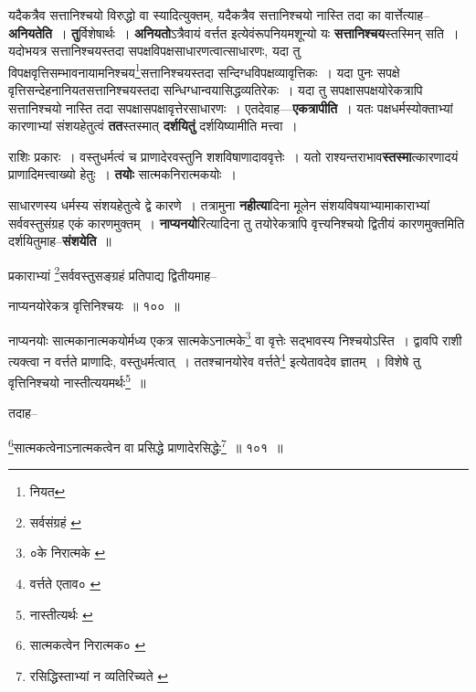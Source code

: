 \documentclass[article,12pt,a4paper]{memoir}
\begin{document}
	  \endgroup
	

	  \pstart यदैकत्रैव सत्तानिश्चयो विरुद्धो वा स्यादित्युक्तम्, यदैकत्रैव सत्तानिश्चयो नास्ति तदा का वार्त्तेत्याह--\textbf{अनियतेति} । \textbf{तु}र्विशेषार्थः । \textbf{अनियतो}ऽत्रैवायं वर्त्तत इत्येवंरूपनियमशून्यो यः \textbf{सत्तानिश्चय}स्तस्मिन् सति । यदोभयत्र सत्तानिश्चयस्तदा सपक्षविपक्षसाधारणत्वात्साधारणः, यदा तु विपक्षवृत्तिसम्भावनायामनिश्चय\footnote{नियत}\-सत्तानिश्चयस्तदा सन्दिग्धविपक्षव्यावृत्तिकः । यदा पुनः सपक्षे वृत्तिसन्देहनानियतसत्तानिश्चयस्तदा सन्धिग्धान्वयासिद्धव्यतिरेकः । यदा तु सपक्षासपक्षयोरेकत्रापि सत्तानिश्चयो नास्ति तदा सपक्षासपक्षावृत्तेरसाधारणः । एतदेवाह—\textbf{एकत्रापीति} । यतः पक्षधर्मस्योक्ताभ्यां कारणाभ्यां संशयहेतुत्वं \textbf{तत}स्तस्मात् \textbf{दर्शयितुं} दर्शयिष्यामीति मत्त्वा ।
	\pend
      

	  \pstart राशिः प्रकारः । वस्तुधर्मत्वं च प्राणादेरवस्तुनि शशविषाणादाववृत्तेः । यतो राश्यन्तराभाव\textbf{स्तस्मा}त्कारणादयं प्राणादिमत्त्वाख्यो हेतुः । \textbf{तयोः} सात्मकनिरात्मकयोः ।
	\pend
      

	  \pstart साधारणस्य धर्मस्य संशयहेतुत्वे द्वे कारणे । तत्रामुना \textbf{नहीत्या}दिना मूलेन संशयविषयाभ्यामाकाराभ्यां सर्ववस्तुसंग्रह एकं कारणमुक्तम् । \textbf{नाप्यनयो}रित्यादिना तु तयोरेकत्रापि वृत्त्यनिश्चयो द्वितीयं कारणमुक्तमिति दर्शयितुमाह--\textbf{संशयेति} ॥
	\pend
	  \bigskip
	  \begingroup
	

	  \pstart प्रकाराभ्यां \footnote{सर्वसंग्रहं \cite{dp-msA} \cite{dp-msB} \cite{dp-msC} \cite{dp-edP} \cite{dp-edH} \cite{dp-edE} \cite{dp-edN}}\-सर्ववस्तुसङ्ग्रहं प्रतिपाद्य द्वितीयमाह--
	\pend
       
	  \bigskip
	  \begingroup
	

	  \pstart नाप्यनयोरेकत्र वृत्तिनिश्चयः ॥ १०० ॥
	\pend
      
	  \endgroup
	 

	  \pstart नाप्यनयोः सात्मकानात्मकयोर्मध्य एकत्र सात्मकेऽनात्मके\footnote{०के निरात्मके \cite{dp-msC}} वा वृत्तेः सद्भावस्य निश्चयोऽस्ति । द्वावपि राशी त्यक्त्वा न वर्त्तते प्राणादिः, वस्तुधर्मत्वात् । ततश्चानयोरेव वर्त्तते\footnote{वर्त्तते एताव० \cite{dp-msC}} इत्येतावदेव ज्ञातम् । विशेषे तु वृत्तिनिश्चयो नास्तीत्ययमर्थः\footnote{नास्तीत्यर्थः \cite{dp-msC} \cite{dp-msD}} ॥
	\pend
       

	  \pstart तदाह--
	\pend
       
	  \bigskip
	  \begingroup
	

	  \pstart \footnote{सात्मकत्वेन निरात्मक० \cite{dp-msB} \cite{dp-edP} \cite{dp-edH} \cite{dp-edE} \cite{dp-edN}}\-सात्मकत्वेनाऽनात्मकत्वेन वा प्रसिद्धे प्राणादेरसिद्धेः\footnote{रसिद्धिस्ताभ्यां न व्यतिरिच्यते \cite{dp-edE}} ॥ १०१ ॥
	\pend
      
\end{document}
